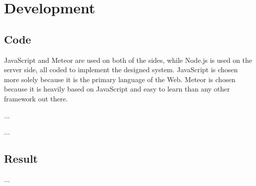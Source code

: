 \section{Development}
\label{sec:development}

\subsection{Code}

JavaScript and Meteor are used on both of the sides, while Node.js is used on the server side, all coded to implement the designed system.
JavaScript is chosen more solely because it is the primary language of the Web.
Meteor is chosen because it is heavily based on JavaScript and easy to learn than any other framework out there.



...



...


\subsection{Result}


...
